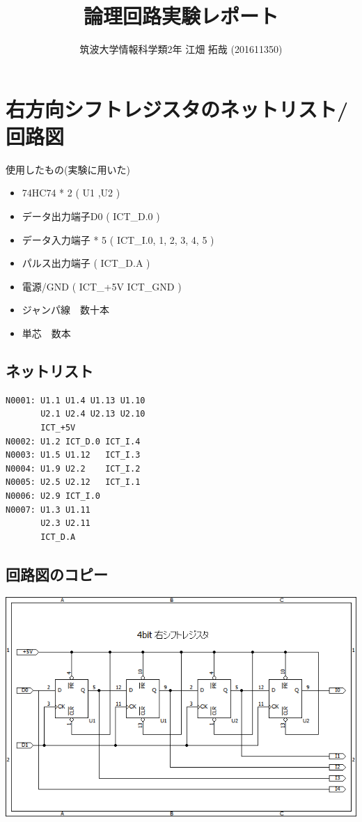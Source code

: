 \documentclass{scrartcl}
\author{筑波大学情報科学類2年 江畑 拓哉 (201611350)}
\date{}
\title{論理回路実験レポート}
\begin{document}
\maketitle
\section{右方向シフトレジスタのネットリスト/回路図}
\label{sec:orgf6d78de}
使用したもの(実験に用いた)\\
\begin{itemize}
\item 74HC74 * 2 ( U1 ,U2 )\\
\item データ出力端子D0 ( ICT\_D.0 )\\
\item データ入力端子 * 5   ( ICT\_I.0, 1, 2, 3, 4, 5 )\\
\item パルス出力端子 ( ICT\_D.A )\\
\item 電源/GND ( ICT\_+5V ICT\_GND )\\
\item ジャンパ線　数十本\\
\item 単芯　数本\\
\end{itemize}
\subsection{ネットリスト}
\label{sec:org1a4bc2c}

\begin{verbatim}
N0001: U1.1 U1.4 U1.13 U1.10
       U2.1 U2.4 U2.13 U2.10
       ICT_+5V
N0002: U1.2 ICT_D.0 ICT_I.4
N0003: U1.5 U1.12   ICT_I.3 
N0004: U1.9 U2.2    ICT_I.2
N0005: U2.5 U2.12   ICT_I.1
N0006: U2.9 ICT_I.0
N0007: U1.3 U1.11 
       U2.3 U2.11 
       ICT_D.A
\end{verbatim}
\subsection{回路図のコピー}
\label{sec:org26de43e}
\begin{center}
\includegraphics[width=15cm]{./logic.png}
\end{center}
\end{document}
